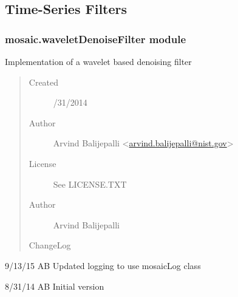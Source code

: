 \documentclass[letterpaper,10pt,english]{sphinxmanual}
\begin{document}
\subsection{Time-Series Filters}
\label{api-doc/mosaic.filter::doc}\label{api-doc/mosaic.filter:time-series-filters}

\subsubsection{mosaic.waveletDenoiseFilter module}
\label{api-doc/mosaic.filter:mosaic-waveletdenoisefilter-module}\label{api-doc/mosaic.filter:module-mosaic.waveletDenoiseFilter}
Implementation of a wavelet based denoising filter
\begin{quote}\begin{description}
\item[{Created}] /31/2014

\item[{Author}] \leavevmode
Arvind Balijepalli \textless{}\href{mailto:arvind.balijepalli@nist.gov}{arvind.balijepalli@nist.gov}\textgreater{}

\item[{License}] \leavevmode
See LICENSE.TXT

\item[{Author}] \leavevmode
Arvind Balijepalli

\item[{ChangeLog}] \leavevmode
\end{description}\end{quote}

\begin{DUlineblock}{0em}
\item[] 9/13/15         AB      Updated logging to use mosaicLog class
\item[] 8/31/14         AB      Initial version
\end{DUlineblock}
\end{document}
